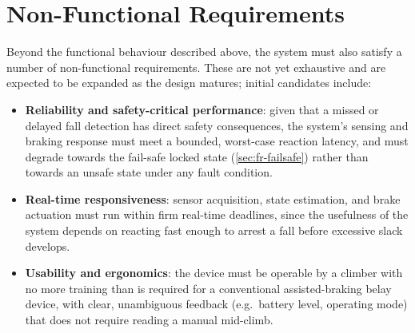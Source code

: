 \section{Non-Functional Requirements}
\label{sec:non-functional-requirements}

Beyond the functional behaviour described above, the system must also
satisfy a number of non-functional requirements. These are not yet
exhaustive and are expected to be expanded as the design matures; initial
candidates include:

\begin{itemize}
    \item \textbf{Reliability and safety-critical performance}: given
        that a missed or delayed fall detection has direct safety
        consequences, the system's sensing and braking response must
        meet a bounded, worst-case reaction latency, and must degrade
        towards the fail-safe locked state (\cref{sec:fr-failsafe})
        rather than towards an unsafe state under any fault condition.
    \item \textbf{Real-time responsiveness}: sensor acquisition, state
        estimation, and brake actuation must run within firm real-time
        deadlines, since the usefulness of the system depends on
        reacting fast enough to arrest a fall before excessive slack
        develops.
    \item \textbf{Usability and ergonomics}: the device must be
        operable by a climber with no more training than is required for
        a conventional assisted-braking belay device, with clear,
        unambiguous feedback (e.g.\ battery level, operating mode) that
        does not require reading a manual mid-climb.
\end{itemize}
